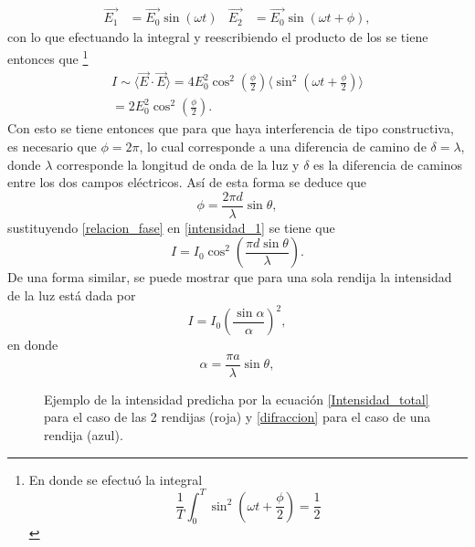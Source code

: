\documentclass[%
 reprint,
 amsmath,amssymb,
 aps,
]{revtex4-1}
\begin{document}
\begin{align}
\vec{E_1}&=\vec{E_0}\sin(\omega t)   &  \vec{E_2}&=\vec{E_0}\sin(\omega t+ \phi),
\label{campos electricos}
\end{align}
con lo que efectuando la integral y reescribiendo el producto de los  se tiene entonces que \footnote{En donde se efectuó la integral
\[ \frac{1}{T}\int_{0}^{T}\sin^2\left(\omega t+\frac{\phi}{2}\right)=\frac{1}{2}\]
}
\begin{multline}
I\sim  \langle \vec{E}\cdot \vec{E}\rangle = 4E_0^2 \cos^2\left(\frac{\phi}{2}\right)\langle\sin^2\left(\omega t+\frac{\phi}{2}\right)\rangle \\
=2E_0^2\cos^2\left(\frac{\phi}{2}\right).
\label{intensidad_1}
\end{multline}
Con esto se tiene entonces que para que haya interferencia de tipo constructiva, es necesario que $\phi=2\pi$, lo cual corresponde a una diferencia de camino de $\delta=\lambda$, donde $\lambda$ corresponde la longitud de onda de la luz y $\delta$ es la diferencia de caminos entre los dos campos eléctricos. Así de esta forma se deduce que
\begin{equation}
\phi = \frac{2\pi d}{\lambda}\sin\theta,
\label{relacion_fase}
\end{equation}
sustituyendo \eqref{relacion_fase} en \eqref{intensidad_1} se tiene que
\begin{equation}
I=I_0\cos^2\left(\frac{\pi d \sin\theta}{\lambda}\right).
\label{interferencia}
\end{equation}
De una forma similar, se puede mostrar que para una sola rendija la intensidad  de la luz está dada por
\begin{equation}
I=I_0\left(\frac{\sin\alpha}{\alpha}\right)^2,
\label{difraccion}
\end{equation}
en donde
\begin{equation}
\alpha=\frac{\pi a}{\lambda}\sin\theta,
\end{equation}
\begin{figure}[h]
\caption{\label{ejemplo interferencia} Ejemplo de la intensidad predicha por la ecuación \eqref{Intensidad_total} para el caso de las 2 rendijas (roja) y \eqref{difraccion} para el caso de una rendija (azul).}
\end{figure}
\end{document}
